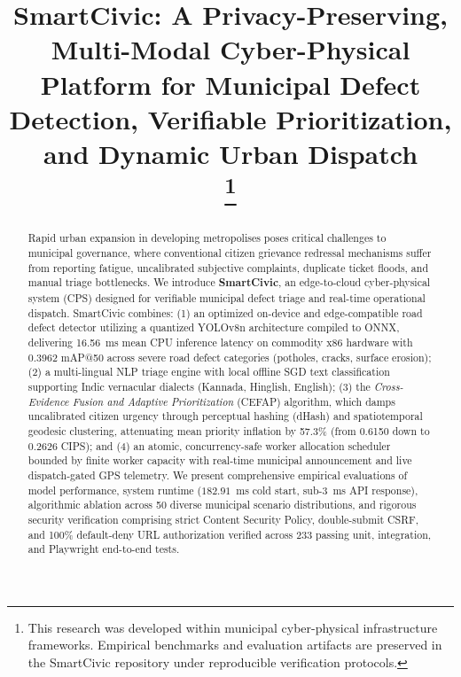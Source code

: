 \documentclass[conference]{IEEEtran}
\begin{document}
\title{SmartCivic: A Privacy-Preserving, Multi-Modal Cyber-Physical Platform for Municipal Defect Detection, Verifiable Prioritization, and Dynamic Urban Dispatch\\
\thanks{This research was developed within municipal cyber-physical infrastructure frameworks. Empirical benchmarks and evaluation artifacts are preserved in the SmartCivic repository under reproducible verification protocols.}
}

\author{
}

\maketitle

\begin{abstract}
Rapid urban expansion in developing metropolises poses critical challenges to municipal governance, where conventional citizen grievance redressal mechanisms suffer from reporting fatigue, uncalibrated subjective complaints, duplicate ticket floods, and manual triage bottlenecks. We introduce \textbf{SmartCivic}, an edge-to-cloud cyber-physical system (CPS) designed for verifiable municipal defect triage and real-time operational dispatch. SmartCivic combines: (1) an optimized on-device and edge-compatible road defect detector utilizing a quantized YOLOv8n architecture compiled to ONNX, delivering 16.56~ms mean CPU inference latency on commodity x86 hardware with 0.3962 mAP@50 across severe road defect categories (potholes, cracks, surface erosion); (2) a multi-lingual NLP triage engine with local offline SGD text classification supporting Indic vernacular dialects (Kannada, Hinglish, English); (3) the \textit{Cross-Evidence Fusion and Adaptive Prioritization} (CEFAP) algorithm, which damps uncalibrated citizen urgency through perceptual hashing (dHash) and spatiotemporal geodesic clustering, attenuating mean priority inflation by 57.3\% (from 0.6150 down to 0.2626 CIPS); and (4) an atomic, concurrency-safe worker allocation scheduler bounded by finite worker capacity with real-time municipal announcement and live dispatch-gated GPS telemetry. We present comprehensive empirical evaluations of model performance, system runtime ($182.91$~ms cold start, sub-3~ms API response), algorithmic ablation across 50 diverse municipal scenario distributions, and rigorous security verification comprising strict Content Security Policy, double-submit CSRF, and 100\% default-deny URL authorization verified across 233 passing unit, integration, and Playwright end-to-end tests.
\end{abstract}
\end{document}
